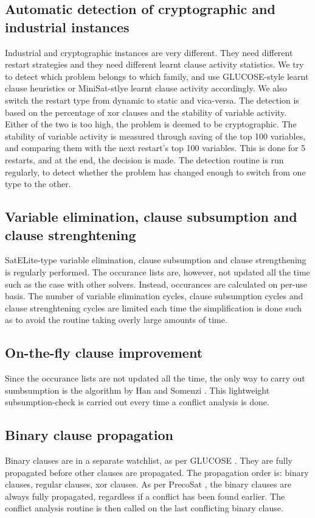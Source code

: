 \documentclass[final]{ieee}
\begin{document}
\subsection{Automatic detection of cryptographic and industrial instances}
Industrial and cryptographic instances are very different. They need different restart strategies and they need different learnt clause activity statistics. We try to detect which problem belongs to which family, and use GLUCOSE-style learnt clause heuristics \cite{DBLP:conf/ijcai/AudemardS09} or MiniSat-stlye learnt clause activity accordingly. We also switch the restart type from dynamic to static and vica-versa. The detection is based on the percentage of xor clauses and the stability of variable activity. Either of the two is too high, the problem is deemed to be cryptographic. The stability of variable activity is measured through saving of the top 100 variables, and comparing them with the next restart's top 100 variables. This is done for 5 restarts, and at the end, the decision is made. The detection routine is run regularly, to detect whether the problem has changed enough to switch from one type to the other.

\subsection{Variable elimination, clause subsumption and clause strenghtening}
SatELite-type variable elimination, clause subsumption and clause strengthening is regularly performed. The occurance lists are, however, not updated all the time such as the case with other solvers. Instead, occurances are calculated on per-use basis. The number of variable elimination cycles, clause subsumption cycles and clause strenghtening cycles are limited each time the simplification is done such as to avoid the routine taking overly large amounts of time.

\subsection{On-the-fly clause improvement}
Since the occurance lists are not updated all the time, the only way to carry out sumbsumption is the algorithm by Han and Somenzi \cite{DBLP:conf/sat/HanS09}. This lightweight subsumption-check is carried out every time a conflict analysis is done.

\subsection{Binary clause propagation}
Binary clauses are in a separate watchlist, as per GLUCOSE \cite{glucose}. They are fully propagated before other clauses are propagated. The propagation order is: binary clauses, regular clauses, xor clauses. As per PrecoSat \cite{precosat}, the binary clauses are always fully propagated, regardless if a conflict has been found earlier. The conflict analysis routine is then called on the last conflicting binary clause.
\end{document}
